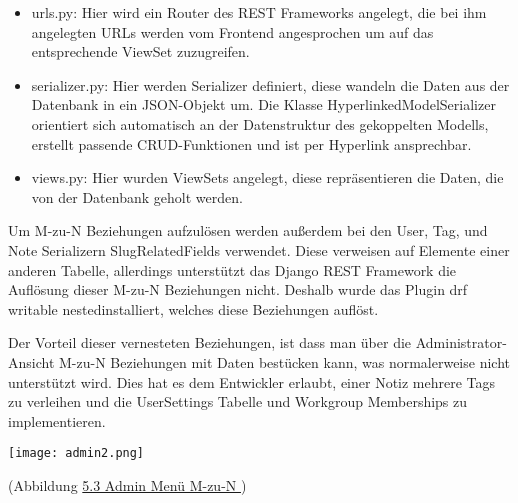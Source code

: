             \begin{itemize}
                \item urls.py: Hier wird ein Router des REST Frameworks angelegt, die bei ihm angelegten URLs werden vom Frontend angesprochen um auf das entsprechende ViewSet zuzugreifen.
                \item serializer.py: Hier werden Serializer definiert, diese wandeln die Daten aus der Datenbank in ein JSON-Objekt um.
                                    Die Klasse HyperlinkedModelSerializer orientiert sich automatisch an der Datenstruktur des gekoppelten Modells, erstellt passende CRUD-Funktionen und ist per Hyperlink ansprechbar.
                \item views.py: Hier wurden ViewSets angelegt, diese repräsentieren die Daten, die von der Datenbank geholt werden.
            \end{itemize}
        
            \bigskip\noindent
            Um M-zu-N Beziehungen aufzulösen werden außerdem bei den User, Tag, und Note Serializern SlugRelatedFields verwendet.
            Diese verweisen auf Elemente einer anderen Tabelle, allerdings unterstützt das Django REST Framework die Auflösung dieser M-zu-N Beziehungen nicht.
            Deshalb wurde das Plugin \flqq drf writable nested\frqq installiert, welches diese Beziehungen auflöst.

            \bigskip\noindent
            Der Vorteil dieser vernesteten Beziehungen, ist dass man über die Administrator-Ansicht M-zu-N Beziehungen mit Daten bestücken kann, was normalerweise nicht
            unterstützt wird. Dies hat es dem Entwickler erlaubt, einer Notiz mehrere Tags zu verleihen und die UserSettings Tabelle und Workgroup Memberships zu
            implementieren.

            \bigskip\noindent
        \begin{center}
            \texttt{[image: admin2.png]}
        \end{center}
        \begin{center}
            (Abbildung \hyperref[admin2]{5.3 Admin Menü M-zu-N })
        \end{center}